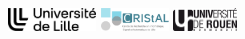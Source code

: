 \begin{frame}
    \titlepage

    \centering

    \includegraphics[height=0.6125cm]{assets/logos/universite-lille.logo.png}
    \hspace{1em}
    \vrule width 0.5pt
    \hspace{1em}
    \includegraphics[height=0.6125cm]{assets/logos/cristal-lab.logo.png}
    \hspace{1em}
    \vrule width 0.5pt
    \hspace{1em}
    \includegraphics[height=0.6125cm]{assets/logos/universite-rouen.logo.png} 
\end{frame}